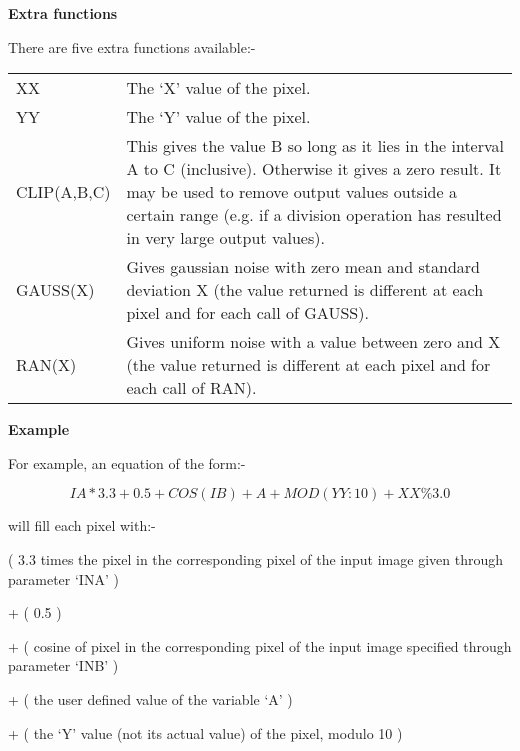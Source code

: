 \begin{small}
{{{\hspace*{4ex} \bf  Extra functions}
 
 There are five extra functions available:-
 
\begin{tabular}{|l|p{4.5in}|}\hline
    XX          & The `X' value of the pixel. \\
    YY          & The `Y' value of the pixel. \\
    CLIP(A,B,C) & This gives the value B so long as it lies in the
                  interval A to C (inclusive). Otherwise it gives a
                  zero result. It may be used to remove output values
                  outside a certain range (e.g. if a division operation
                  has resulted in very large output values). \\
    GAUSS(X)    & Gives gaussian noise with zero mean and standard
                  deviation X (the value returned is different at each
                  pixel and for each call of GAUSS). \\
    RAN(X)      & Gives uniform noise with a value between zero and X
                  (the value returned is different at each pixel and
                  for each call of RAN). \\
\hline\end{tabular}
 
{\hspace*{4ex} \bf  Example}
 
 
  For example, an equation of the form:-
 
        $$  IA*3.3 + 0.5 + COS(IB) + A + MOD(YY:10) + XX\%3.0 $$
 
  will fill each pixel with:- \newline
 
( 3.3 times the pixel in the corresponding pixel of the input image
        given through parameter `INA' ) \newline
 
+ ( 0.5 ) \newline
 
+ ( cosine of pixel in the corresponding pixel of the input image
        specified through parameter `INB' ) \newline
 
+ ( the user defined value of the variable `A' ) \newline
 
+ ( the `Y' value (not its actual value) of the pixel, modulo 10 ) \newline

}}
\end{small}
